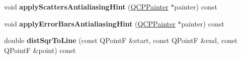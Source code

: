 \begin{DoxyCompactItemize}
\item 
\hypertarget{classQCPAbstractPlottable_a753272ee225a62827e90c3e1e78de4b1}{}void {\bfseries apply\+Scatters\+Antialiasing\+Hint} (\hyperlink{classQCPPainter}{Q\+C\+P\+Painter} $\ast$painter) const \label{classQCPAbstractPlottable_a753272ee225a62827e90c3e1e78de4b1}

\item 
\hypertarget{classQCPAbstractPlottable_af687bfe6160255960558eb71f1f81e73}{}void {\bfseries apply\+Error\+Bars\+Antialiasing\+Hint} (\hyperlink{classQCPPainter}{Q\+C\+P\+Painter} $\ast$painter) const \label{classQCPAbstractPlottable_af687bfe6160255960558eb71f1f81e73}

\item 
\hypertarget{classQCPAbstractPlottable_a5ea1cab44ca912dcdc96ed81ec5bed5d}{}double {\bfseries dist\+Sqr\+To\+Line} (const Q\+Point\+F \&start, const Q\+Point\+F \&end, const Q\+Point\+F \&point) const \label{classQCPAbstractPlottable_a5ea1cab44ca912dcdc96ed81ec5bed5d}

\end{DoxyCompactItemize}
